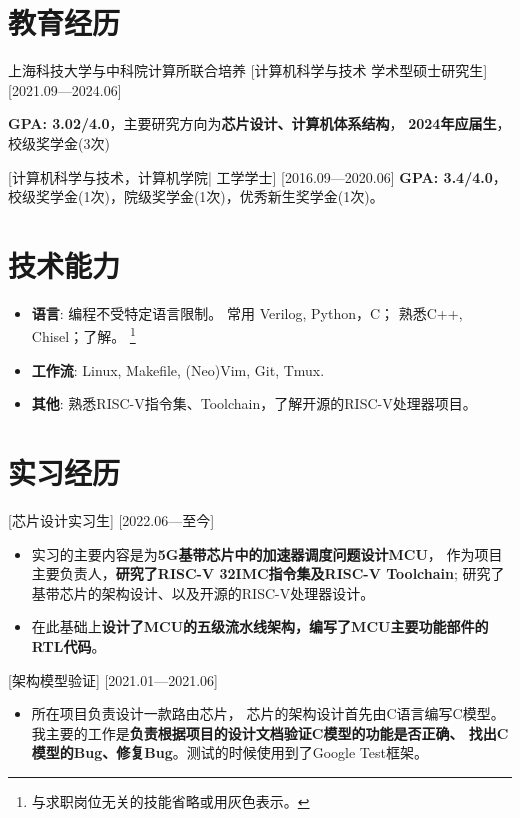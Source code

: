 \documentclass{resume}
\begin{document}

\ResumeTitle

\section{教育经历}
\ResumeItem
{上海科技大学与中科院计算所联合培养}
[\textnormal{计算机科学与技术}  学术型硕士研究生]
[2021.09—2024.06]

\textbf{GPA: 3.02/4.0}，主要研究方向为\textbf{芯片设计、计算机体系结构}，
\textbf{2024年应届生}，校级奖学金(3次)

[\textnormal{计算机科学与技术，计算机学院|} 工学学士]
[2016.09—2020.06]
\textbf{GPA: 3.4/4.0}，校级奖学金(1次)，院级奖学金(1次)，优秀新生奖学金(1次)。

\section{技术能力}
\begin{itemize}
  \item \textbf{语言}: 编程不受特定语言限制。
      常用 Verilog, Python，C； 熟悉C++, Chisel；了解。
      \footnote{与求职岗位无关的技能省略或用灰色表示。}
  \item \textbf{工作流}: Linux, Makefile, (Neo)Vim, Git, Tmux.
  \item \textbf{其他}: 熟悉RISC-V指令集、Toolchain，了解开源的RISC-V处理器项目。
\end{itemize}

\section{实习经历}

[芯片设计实习生]
[2022.06—至今] 
\begin{itemize}
    \item 实习的主要内容是为\textbf{5G基带芯片中的加速器调度问题设计MCU}，
        作为项目主要负责人，\textbf{研究了RISC-V 32IMC指令集及RISC-V Toolchain};
        研究了基带芯片的架构设计、以及开源的RISC-V处理器设计。
    \item 在此基础上\textbf{设计了MCU的五级流水线架构，编写了MCU主要功能部件的RTL代码}。
\end{itemize}
[架构模型验证]
[2021.01—2021.06] 
\begin{itemize}
  \item 所在项目负责设计一款路由芯片，
      芯片的架构设计首先由C语言编写C模型。
      我主要的工作是\textbf{负责根据项目的设计文档验证C模型的功能是否正确、
      找出C模型的Bug、修复Bug}。测试的时候使用到了Google Test框架。
\end{itemize}
\end{document}
